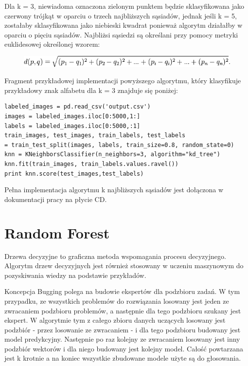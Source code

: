 \documentclass[brudnopis]{xmgr}
\begin{document}
Dla k = 3, niewiadoma oznaczona zielonym punktem będzie sklasyfikowana jako czerwony trójkąt w oparciu o trzech najbliższych sąsiadów, jednak jeśli k = 5, zostałaby sklasyfikowana jako niebieski kwadrat ponieważ algorytm działałby w oparciu o pięciu sąsiadów. Najbliżsi sąsiedzi są określani przy pomocy metryki euklidesowej określonej wzorem:

\begin{figure}[!tbh]
\centering
\includegraphics[width=1\hsize]{fig/knn-wzor}
\end{figure}

Fragment przykładowej implementacji powyższego algorytmu, który klasyfikuje przykładowy znak alfabetu dla k = 3 znajduje się poniżej:

\begin{verbatim}
labeled_images = pd.read_csv('output.csv')
images = labeled_images.iloc[0:5000,1:]
labels = labeled_images.iloc[0:5000,:1]
train_images, test_images, train_labels, test_labels 
= train_test_split(images, labels, train_size=0.8, random_state=0)
knn = KNeighborsClassifier(n_neighbors=3, algorithm="kd_tree")
knn.fit(train_images, train_labels.values.ravel())
print knn.score(test_images,test_labels)
\end{verbatim}

Pełna implementacja algorytmu k najbliższych sąsiadów jest dołączona w dokumentacji pracy na płycie CD.

\section{Random Forest}
Drzewa decyzyjne to graficzna metoda wspomagania procesu decyzyjnego. Algorytm drzew decyzyjnych jest również stosowany w uczeniu maszynowym do pozyskiwania wiedzy na podstawie przykładów.
\newpage

Koncepcja Bugging polega na budowie ekspertów dla podzbioru zadań. W tym przypadku, ze wszystkich problemów do rozwiązania losowany jest jeden ze zwracaniem podzbioru problemów, a następnie dla tego podzbioru szukany jest ekspert. W algorytmie tym z całego zbioru danych uczących losowany jest podzbiór - przez losowanie ze zwracaniem - i dla tego podzbioru budowany jest model predykcyjny. Następnie po raz kolejny ze zwracaniem losowany jest inny podzbiór wektorów i dla niego budowany jest kolejny model. Całość powtarzana jest k krotnie a na koniec wszystkie zbudowane modele użyte są do głosowania.
\end{document}
